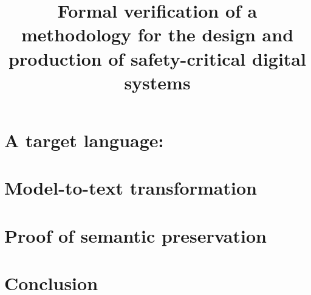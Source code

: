 \documentclass[pdflatex,sn-mathphys]{sn-jnl}%
\theoremstyle{thmstyleone}%
\theoremstyle{thmstyletwo}%
\theoremstyle{thmstylethree}%
\begin{document}
\title[Formal verification of the \hilecop{} methodology]{Formal verification of a methodology for the design and
  production of safety-critical digital systems}


\author*[1]{ }
\author[1]{ }
\author[1,2]{ }




\abstract{}

\keywords{}

\maketitle

\listoftodos




\section{A target language: \hvhdl{}}
\label{sec:hvhdl}

\section{Model-to-text transformation}
\label{sec:m2t}

\section{Proof of semantic preservation}
\label{sec:proof}

\section{Conclusion}
\label{sec:concl}



\end{document}

